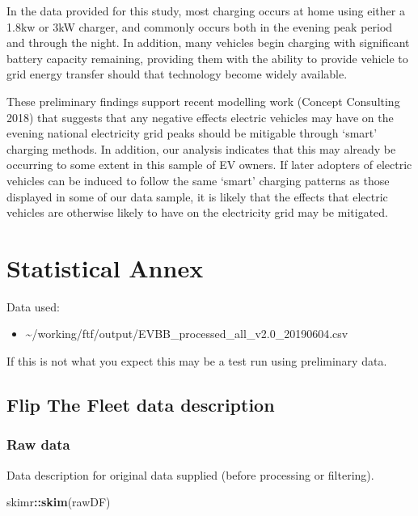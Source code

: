 \documentclass[]{article}
\newenvironment{Shaded}{\begin{snugshade}}{\end{snugshade}}
\newcommand{\KeywordTok}[1]{\textcolor[rgb]{0.13,0.29,0.53}{\textbf{#1}}}
\newcommand{\NormalTok}[1]{#1}
\newcommand{\OperatorTok}[1]{\textcolor[rgb]{0.81,0.36,0.00}{\textbf{#1}}}
\providecommand{\tightlist}{%
  \setlength{\itemsep}{0pt}\setlength{\parskip}{0pt}}
\begin{document}
In the data provided for this study, most charging occurs at home using either a 1.8kw or 3kW charger, and commonly occurs both in the evening peak period and through the night. In addition, many vehicles begin charging with significant battery capacity remaining, providing them with the ability to provide vehicle to grid energy transfer should that technology become widely available.

These preliminary findings support recent modelling work (Concept Consulting 2018) that suggests that any negative effects electric vehicles may have on the evening national electricity grid peaks should be mitigable through `smart' charging methods. In addition, our analysis indicates that this may already be occurring to some extent in this sample of EV owners. If later adopters of electric vehicles can be induced to follow the same `smart' charging patterns as those displayed in some of our data sample, it is likely that the effects that electric vehicles are otherwise likely to have on the electricity grid may be mitigated.

\hypertarget{statistical-annex}{%
\section{Statistical Annex}\label{statistical-annex}}

Data used:

\begin{itemize}
\tightlist
\item
  \textasciitilde/working/ftf/output/EVBB\_processed\_all\_v2.0\_20190604.csv
\end{itemize}

If this is not what you expect this may be a test run using preliminary data.

\hypertarget{flip-the-fleet-data-description}{%
\subsection{Flip The Fleet data description}\label{flip-the-fleet-data-description}}

\hypertarget{raw-data}{%
\subsubsection{Raw data}\label{raw-data}}

Data description for original data supplied (before processing or filtering).

\begin{Shaded}
\begin{Highlighting}[]
\NormalTok{skimr}\OperatorTok{::}\KeywordTok{skim}\NormalTok{(rawDF)}
\end{Highlighting}
\end{Shaded}
\end{document}
